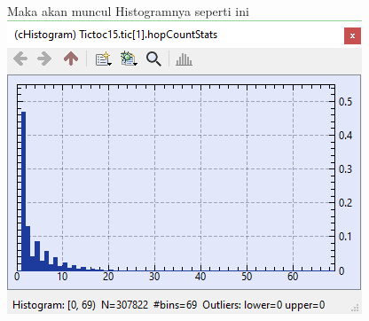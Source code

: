 \documentclass[conference]{IEEEtran}
\begin{document}
\begin{enumerate}
        Maka akan muncul Histogramnya seperti ini\break
        \includegraphics[scale=0.65]{images/tic[1]-histogram2.png}
\end{enumerate}
\end{document}
